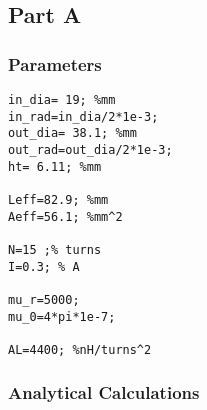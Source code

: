 \sloppy
{}
\setlength{\parindent}{0pt}

  
    
\subsection*{Part A}

\subsubsection*{Parameters}

\begin{verbatim}
in_dia= 19; %mm
in_rad=in_dia/2*1e-3;
out_dia= 38.1; %mm
out_rad=out_dia/2*1e-3;
ht= 6.11; %mm

Leff=82.9; %mm
Aeff=56.1; %mm^2

N=15 ;% turns
I=0.3; % A

mu_r=5000;
mu_0=4*pi*1e-7;

AL=4400; %nH/turns^2
\end{verbatim}


\subsubsection*{Analytical Calculations}

